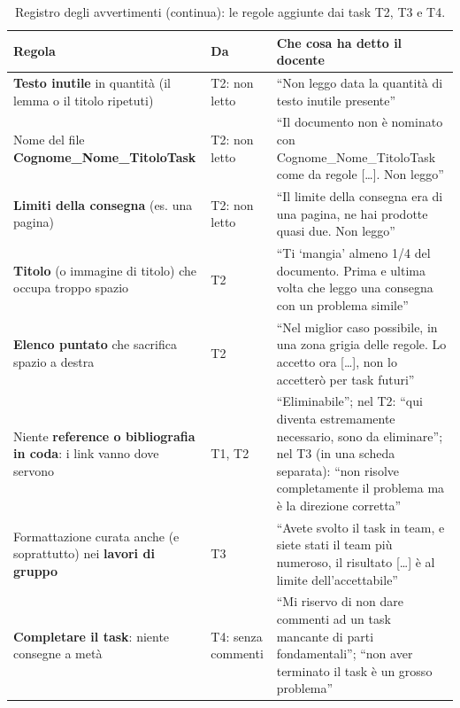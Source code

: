 \begin{table}[htbp]
  \centering
  \caption{Registro degli avvertimenti (continua): le regole aggiunte dai
  task T2, T3 e T4.}
  \label{rv:tab:avvertimenti-t2}
  \small
  \begin{tabular}{@{}p{5.1cm}p{1.1cm}p{5.6cm}@{}}
    \toprule
    \textbf{Regola} & \textbf{Da} & \textbf{Che cosa ha detto il docente} \\
    \midrule
    \textbf{Testo inutile} in quantità (il lemma o il titolo ripetuti) &
      T2: non letto & ``Non leggo data la quantità di testo inutile
      presente'' \\
    \addlinespace
    Nome del file \textbf{Cognome\_\allowbreak Nome\_\allowbreak TitoloTask} &
      T2: non letto & ``Il documento non è nominato con
      Cognome\_\allowbreak Nome\_\allowbreak TitoloTask come da regole [\dots]. Non leggo'' \\
    \addlinespace
    \textbf{Limiti della consegna} (es. una pagina) &
      T2: non letto & ``Il limite della consegna era di una pagina, ne hai
      prodotte quasi due. Non leggo'' \\
    \addlinespace
    \textbf{Titolo} (o immagine di titolo) che occupa troppo spazio &
      T2 & ``Ti `mangia' almeno 1/4 del documento. Prima e ultima volta che
      leggo una consegna con un problema simile'' \\
    \addlinespace
    \textbf{Elenco puntato} che sacrifica spazio a destra &
      T2 & ``Nel miglior caso possibile, in una zona grigia delle regole. Lo
      accetto ora [\dots], non lo accetterò per task futuri'' \\
    \addlinespace
    Niente \textbf{reference o bibliografia in coda}: i link vanno dove
    servono &
      T1, T2 & ``Eliminabile''; nel T2: ``qui diventa estremamente necessario,
      sono da eliminare''; nel T3 (in una scheda separata): ``non risolve
      completamente il problema ma è la direzione corretta'' \\
    \addlinespace
    Formattazione curata anche (e soprattutto) nei \textbf{lavori di
    gruppo} &
      T3 & ``Avete svolto il task in team, e siete stati il team più
      numeroso, il risultato [\dots] è al limite dell'accettabile'' \\
    \addlinespace
    \textbf{Completare il task}: niente consegne a metà &
      T4: senza commenti & ``Mi riservo di non dare commenti ad un task
      mancante di parti fondamentali''; ``non aver terminato il task è un
      grosso problema'' \\

\end{tabular}
\end{table}
